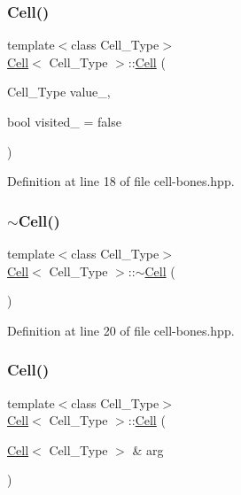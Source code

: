 \mbox{\label{class_cell_a6592b5fcfc80001c8de64a2e722ca715}} 
\subsubsection{\texorpdfstring{Cell()}{Cell()}\hspace{0.1cm}{\footnotesize\ttfamily [2/13]}}
{\footnotesize\ttfamily template$<$class Cell\+\_\+\+Type$>$ \\
\hyperlink{class_cell}{Cell}$<$ Cell\+\_\+\+Type $>$\+::\hyperlink{class_cell}{Cell} (\begin{DoxyParamCaption}\item[{Cell\+\_\+\+Type}]{value\+\_\+,  }\item[{bool}]{visited\+\_\+ = {\ttfamily false} }\end{DoxyParamCaption})\hspace{0.3cm}{\ttfamily [inline]}}



Definition at line 18 of file cell-\/bones.\+hpp.

\mbox{\label{class_cell_a12667d768c7eab9e295b3476a5d60c0e}} 
\subsubsection{\texorpdfstring{$\sim$\+Cell()}{~Cell()}}
{\footnotesize\ttfamily template$<$class Cell\+\_\+\+Type$>$ \\
\hyperlink{class_cell}{Cell}$<$ Cell\+\_\+\+Type $>$\+::$\sim$\hyperlink{class_cell}{Cell} (\begin{DoxyParamCaption}{ }\end{DoxyParamCaption})\hspace{0.3cm}{\ttfamily [inline]}}



Definition at line 20 of file cell-\/bones.\+hpp.

\mbox{\label{class_cell_acaa165b5c26774c29a7628eda30a7817}} 
\subsubsection{\texorpdfstring{Cell()}{Cell()}\hspace{0.1cm}{\footnotesize\ttfamily [3/13]}}
{\footnotesize\ttfamily template$<$class Cell\+\_\+\+Type$>$ \\
\hyperlink{class_cell}{Cell}$<$ Cell\+\_\+\+Type $>$\+::\hyperlink{class_cell}{Cell} (\begin{DoxyParamCaption}\item[{\hyperlink{class_cell}{Cell}$<$ Cell\+\_\+\+Type $>$ \&}]{arg }\end{DoxyParamCaption})\hspace{0.3cm}{\ttfamily [inline]}}



